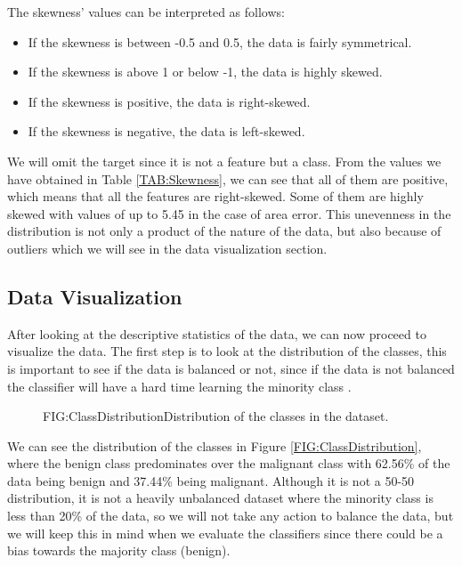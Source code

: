 The skewness' values can be interpreted as follows:
\begin{itemize}
    \item If the skewness is between -0.5 and 0.5, the data is fairly symmetrical.
    \item If the skewness is above 1 or below -1, the data is highly skewed.
    \item If the skewness is positive, the data is right-skewed.
    \item If the skewness is negative, the data is left-skewed.
\end{itemize}

We will omit the target since it is not a feature but a class. From the values we have obtained in Table \ref{TAB:Skewness}, we can see that all of them are positive, which means that all the features are right-skewed. Some of them are highly skewed with values of up to 5.45 in the case of area error. This unevenness in the distribution is not only a product of the nature of the data, but also because of outliers which we will see in the data visualization section.

\subsection{Data Visualization}

After looking at the descriptive statistics of the data, we can now proceed to visualize the data. The first step is to look at the distribution of the classes, this is important to see if the data is balanced or not, since if the data is not balanced the classifier will have a hard time learning the minority class \cite{he_learning_2009}.

\begin{figure}[Class Distribution]{FIG:ClassDistribution}{Distribution of the classes in the dataset.}
\end{figure}

We can see the distribution of the classes in Figure \ref{FIG:ClassDistribution}, where the benign class predominates over the malignant class with 62.56\% of the data being benign and 37.44\% being malignant. Although it is not a 50-50 distribution, it is not a heavily unbalanced dataset where the minority class is less than 20\% of the data, so we will not take any action to balance the data, but we will keep this in mind when we evaluate the classifiers since there could be a bias towards the majority class (benign).

